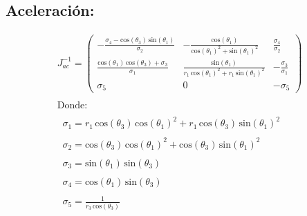 \documentclass[12pt]{article}
\begin{document}
\subsection{Aceleración:}
\begin{equation*}
\begin{array}{l}
J_{ac}^{-1}=\left(\begin{array}{ccc}
-\frac{\sigma_4 -\mathrm{cos}\left(\theta_3 \right)\,\mathrm{sin}\left(\theta_1 \right)}{\sigma_2 } & -\frac{\mathrm{cos}\left(\theta_1 \right)}{{\mathrm{cos}\left(\theta_1 \right)}^2 +{\mathrm{sin}\left(\theta_1 \right)}^2 } & \frac{\sigma_4 }{\sigma_2 }\\
\frac{\mathrm{cos}\left(\theta_1 \right)\,\mathrm{cos}\left(\theta_3 \right)+\sigma_3 }{\sigma_1 } & \frac{\mathrm{sin}\left(\theta_1 \right)}{r_1 \,{\mathrm{cos}\left(\theta_1 \right)}^2 +r_1 \,{\mathrm{sin}\left(\theta_1 \right)}^2 } & -\frac{\sigma_3 }{\sigma_1 }\\
\sigma_5  & 0 & -\sigma_5 
\end{array}\right)\\
\mathrm{}\\
\textrm{Donde:}\\
\mathrm{}\\
\;\;\sigma_1 =r_1 \,\mathrm{cos}\left(\theta_3 \right)\,{\mathrm{cos}\left(\theta_1 \right)}^2 +r_1 \,\mathrm{cos}\left(\theta_3 \right)\,{\mathrm{sin}\left(\theta_1 \right)}^2 \\
\mathrm{}\\
\;\;\sigma_2 =\mathrm{cos}\left(\theta_3 \right)\,{\mathrm{cos}\left(\theta_1 \right)}^2 +\mathrm{cos}\left(\theta_3 \right)\,{\mathrm{sin}\left(\theta_1 \right)}^2 \\
\mathrm{}\\
\;\;\sigma_3 =\mathrm{sin}\left(\theta_1 \right)\,\mathrm{sin}\left(\theta_3 \right)\\
\mathrm{}\\
\;\;\sigma_4 =\mathrm{cos}\left(\theta_1 \right)\,\mathrm{sin}\left(\theta_3 \right)\\
\mathrm{}\\
\;\;\sigma_5 =\frac{1}{r_3 \,\mathrm{cos}\left(\theta_3 \right)}
\end{array}
    \label{jacobiano inv ac}
\end{equation*}
\newpage
\end{document}
